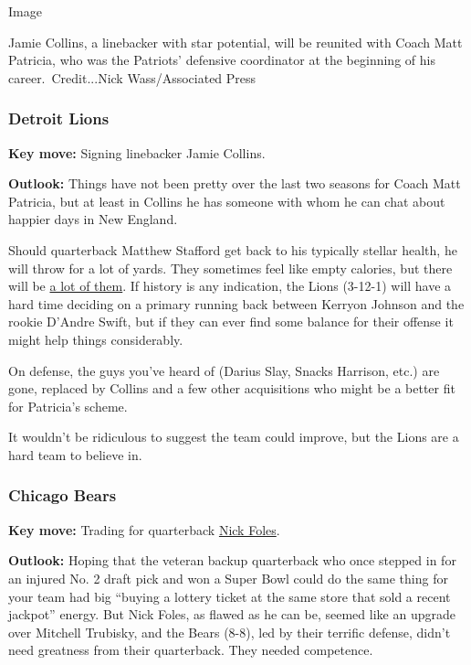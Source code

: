 Image

Jamie Collins, a linebacker with star potential, will be reunited with
Coach Matt Patricia, who was the Patriots' defensive coordinator at the
beginning of his career.~Credit...Nick Wass/Associated Press

\hypertarget{detroit-lions}{%
\subsubsection{\texorpdfstring{\textbf{Detroit
Lions}}{Detroit Lions}}\label{detroit-lions}}

\textbf{Key move:} Signing linebacker Jamie Collins.

\textbf{Outlook:} Things have not been pretty over the last two seasons
for Coach Matt Patricia, but at least in Collins he has someone with
whom he can chat about happier days in New England.

Should quarterback Matthew Stafford get back to his typically stellar
health, he will throw for a lot of yards. They sometimes feel like empty
calories, but there will be
\href{https://www.nytimes3xbfgragh.onion/2018/10/04/sports/drew-brees-passing-yards.html}{a
lot of them}. If history is any indication, the Lions (3-12-1) will have
a hard time deciding on a primary running back between Kerryon Johnson
and the rookie D'Andre Swift, but if they can ever find some balance for
their offense it might help things considerably.

On defense, the guys you've heard of (Darius Slay, Snacks Harrison,
etc.) are gone, replaced by Collins and a few other acquisitions who
might be a better fit for Patricia's scheme.

It wouldn't be ridiculous to suggest the team could improve, but the
Lions are a hard team to believe in.

\hypertarget{chicago-bears}{%
\subsubsection{\texorpdfstring{\textbf{Chicago
Bears}}{Chicago Bears}}\label{chicago-bears}}

\textbf{Key move:} Trading for quarterback
\href{https://www.nytimes3xbfgragh.onion/2020/08/31/sports/football/nfl-quarterback-controversies.html}{Nick
Foles}.

\textbf{Outlook:} Hoping that the veteran backup quarterback who once
stepped in for an injured No. 2 draft pick and won a Super Bowl could do
the same thing for your team had big ``buying a lottery ticket at the
same store that sold a recent jackpot'' energy. But Nick Foles, as
flawed as he can be, seemed like an upgrade over Mitchell Trubisky, and
the Bears (8-8), led by their terrific defense, didn't need greatness
from their quarterback. They needed competence.

